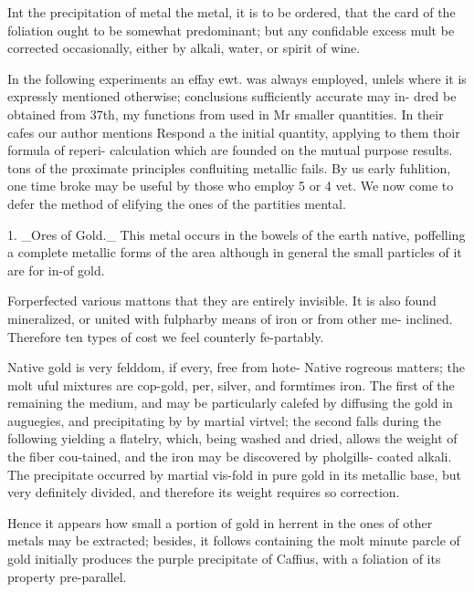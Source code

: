 \documentclass{article}
\begin{document}
Int the precipitation of metal the metal, it is to be ordered, that the card of the foliation ought to be somewhat predominant; but any confidable excess mult be corrected occasionally, either by alkali, water, or spirit of wine.

In the following experiments an effay ewt. was always employed, unlels where it is expressly mentioned otherwise; conclusions sufficiently accurate may in- dred be obtained from 37th, my functions from used in Mr smaller quantities. In their cafes our author mentions Respond a the initial quantity, applying to them thoir formula of reperi- calculation which are founded on the mutual purpose results. tons of the proximate principles confluiting metallic fails. By us early fuhlition, one time broke may be useful by those who employ 5 or 4 vet. We now come to defer the method of elifying the ones of the partities mental.

1. \_Ores of Gold.\_ This metal occurs in the bowels of the earth native, poffelling a complete metallic forms of the area although in general the small particles of it are for in-of gold.

Forperfected various mattons that they are entirely invisible. It is also found mineralized, or united with fulpharby means of iron or from other me- inclined. Therefore ten types of cost we feel counterly fe-partably.

Native gold is very felddom, if every, free from hote- Native rogreous matters; the molt uful mixtures are cop-gold, per, silver, and formtimes iron. The first of the remaining the medium, and may be particularly calefed by diffusing the gold in auguegies, and precipitating by by martial virtvel; the second falls during the following yielding a flatelry, which, being washed and dried, allows the weight of the fiber cou-tained, and the iron may be discovered by pholgills- coated alkali. The precipitate occurred by martial vis-fold in pure gold in its metallic base, but very definitely divided, and therefore its weight requires so correction.

Hence it appears how small a portion of gold in herrent in the ones of other metals may be extracted; besides, it follows containing the molt minute parcle of gold initially produces the purple precipitate of Caffius, with a foliation of its property pre-parallel.
\end{document}

